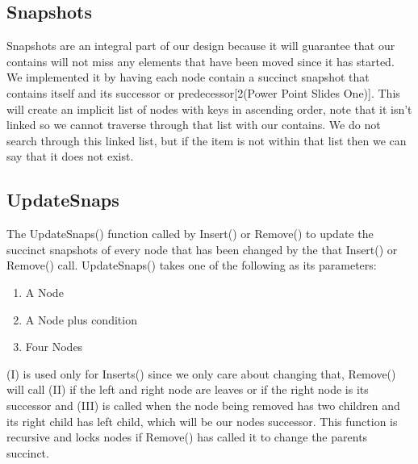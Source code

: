 \documentclass[conference]{IEEEtran}
\begin{document}
\subsection{Snapshots}
Snapshots are an integral part of our design because it will guarantee that our contains will not miss any elements that have been moved since it has started. We implemented it by having each node contain a succinct snapshot that contains itself and its successor or predecessor[2(Power Point Slides One)]. This will create an implicit list of nodes with keys in ascending order, note that it isn't linked so we cannot traverse through that list with our contains. We do not search through this linked list, but if the item is not within that list then we can say that it does not exist.
\subsection{UpdateSnaps}
The UpdateSnaps() function called by Insert() or Remove() to update the succinct snapshots of every node that has been changed by the that Insert() or Remove() call. UpdateSnaps() takes one of the following as its parameters:
\begin{enumerate}[label=(\roman*)]
	\item A Node
	\item A Node plus condition
	\item Four Nodes
\end{enumerate}
(I) is used only for Inserts() since we only care about changing that, Remove() will call (II) if the left and right node are leaves or if the right node is its successor and (III) is called when the node being removed has two children and its right child has left child, which will be our nodes successor. This function is recursive and locks nodes if Remove() has called it to change the parents succinct. 
\end{document}
